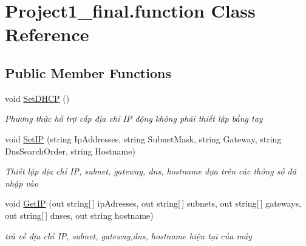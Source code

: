 \hypertarget{class_project1__final_1_1function}{\section{Project1\+\_\+final.\+function Class Reference}
\label{class_project1__final_1_1function}
}
\subsection*{Public Member Functions}
\begin{DoxyCompactItemize}
\item 
void \hyperlink{class_project1__final_1_1function_ab4aed27539bfa8fb98ee2be6962e47d1}{Set\+D\+H\+C\+P} ()
\begin{DoxyCompactList}\small\item\em Phương thức hỗ trợ cấp địa chỉ I\+P động không phải thiết lập bằng tay \end{DoxyCompactList}\item 
void \hyperlink{class_project1__final_1_1function_a601178e35613aa29b16020bfb16df060}{Set\+I\+P} (string Ip\+Addresses, string Subnet\+Mask, string Gateway, string Dns\+Search\+Order, string Hostname)
\begin{DoxyCompactList}\small\item\em Thiết lập địa chỉ I\+P, subnet, gateway, dns, hostname dựa trên các thông số đã nhập vào \end{DoxyCompactList}\item 
void \hyperlink{class_project1__final_1_1function_a85589067c0bf3e73221a1763261a5839}{Get\+I\+P} (out string\mbox{[}$\,$\mbox{]} ip\+Adresses, out string\mbox{[}$\,$\mbox{]} subnets, out string\mbox{[}$\,$\mbox{]} gateways, out string\mbox{[}$\,$\mbox{]} dnses, out string hostname)
\begin{DoxyCompactList}\small\item\em trả về địa chỉ I\+P, subnet, gateway,dns, hostname hiện tại của máy \end{DoxyCompactList}\end{DoxyCompactItemize}


